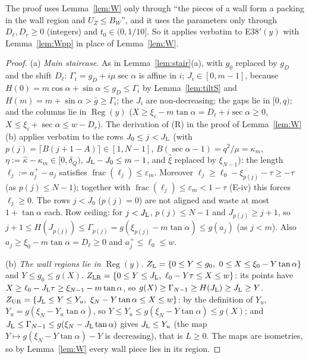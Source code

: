 \documentclass[11pt]{amsart}
\newcommand{\Reg}{\operatorname{Reg}}
\newcommand{\ca}{\cos\alpha}
\newcommand{\sa}{\sin\alpha}
\newcommand{\ta}{\tan\alpha}
\newcommand{\se}{\sec\alpha}
\theoremstyle{definition}
\theoremstyle{remark}
\numberwithin{equation}{section}
\begin{document}
The proof uses Lemma~\ref{lem:W} only through ``the pieces of a wall form a packing in the wall region and
$U_Z\le B_W$'', and it uses the parameters only through $D_\ell,D_r\ge0$ (integers) and $t_0\in(0,1/10]$.
So it applies verbatim to E38$'(y)$ with Lemma~\ref{lem:Wpp} in place of Lemma~\ref{lem:W}.

\begin{proof}
(a) \emph{Main staircase.} As in Lemma~\ref{lem:stair}(a), with $g_0$ replaced by $g_D$ and the shift $D_\ell$:
$\Gamma_i=g_D+i\mu\se$ is affine in $i$; $J_i\in[0,m-1]$, because $H(0)=m\ca+\sa\le g_D\le\Gamma_i$ by
Lemma~\ref{lem:tiltS} and $H(m)=m+\sa>\bar g\ge\Gamma_i$; the $J_i$ are non-decreasing; the gaps lie in $[0,q)$; and the
columns lie in $\Reg(y)$ ($X\ge\xi_i-m\ta=D_\ell+i\se\ge0$, $X\le\xi_i+\se\le w-D_r$). The derivation of (R) in the proof
of Lemma~\ref{lem:W}(b) applies verbatim to the rows $J_0\le j<J_{\rm L}$ (with $p(j)=\lceil B(j+1-A)\rceil\in[1,N-1]$,
$B(\se-1)=q^2/\mu=\kappa_m$, $\eta:=\hat\kappa-\kappa_m\in[0,\delta_Q)$, $J_{\rm L}-J_0\le m-1$, and $\hat\xi$ replaced
by $\xi_{N-1}$): the length $\ell_j:=a_j^+-a_j$ satisfies $\operatorname{frac}(\ell_j)\le\varepsilon_m$. Moreover
$\ell_j\ge\ell_0-\xi_{p(j)}-\tau\ge-\tau$ (as $p(j)\le N-1$); together with $\operatorname{frac}(\ell_j)\le\varepsilon_m<
1-\tau$ (E-iv) this forces $\ell_j\ge0$. The rows $j<J_0$ ($p(j)=0$) are not aligned and waste at most $1+\ta$ each. Row
ceiling: for $j<J_{\rm L}$, $p(j)\le N-1$ and $J_{p(j)}\ge j+1$, so
$j+1\le H(J_{p(j)})\le\Gamma_{p(j)}=g(\xi_{p(j)}-m\ta)\le g(a_j)$ (as $j<m$). Also $a_j\ge\xi_0-m\ta=D_\ell\ge0$ and
$a_j^+\le\ell_0\le w$.

(b) \emph{The wall regions lie in $\Reg(y)$.} $Z_{\rm L}=\{0\le Y\le g_0,\ 0\le X\le\xi_0-Y\ta\}$ and $Y\le g_0\le g(X)$.
$Z_{\rm LR}=\{0\le Y\le J_{\rm L},\ \ell_0-Y\tau\le X\le w\}$: its points have $X\ge\ell_0-J_{\rm L}\tau\ge\xi_{N-1}-m\ta$,
so $g(X)\ge\Gamma_{N-1}\ge H(J_{\rm L})\ge J_{\rm L}\ge Y$. $Z_{\rm UR}=\{J_{\rm L}\le Y\le Y_u,\ \xi_N-Y\ta\le X\le w\}$:
by the definition of $Y_u$, $Y_u=g(\xi_N-Y_u\ta)$, so $Y\le Y_u\le g(\xi_N-Y\ta)\le g(X)$; and
$J_{\rm L}\le\Gamma_{N-1}\le g(\xi_N-J_{\rm L}\ta)$ gives $J_{\rm L}\le Y_u$ (the map $Y\mapsto g(\xi_N-Y\ta)-Y$ is
decreasing), that is $L\ge0$. The maps are isometries, so by Lemma~\ref{lem:W} every wall piece lies in its region.


\end{proof}
\end{document}
